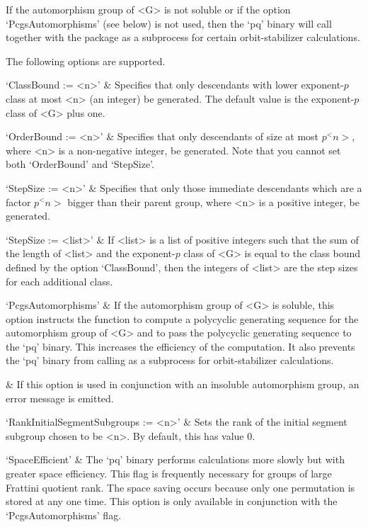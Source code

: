 If the automorphism group  of  <G>  is  not  soluble  or  if  the  option
`PcgsAutomorphisms' (see below) is not used, then the  `pq'  binary  will
call {\GAP} together with the {\AutPGrp}  package  as  a  subprocess  for
certain orbit-stabilizer calculations.

The following options are supported.

\beginitems

`ClassBound := <n>' &
Specifies that only descendants with lower exponent-$p$ class at most <n>
(an integer) be generated. The default value is the exponent-$p$ class of
<G> plus one.

`OrderBound := <n>' &
Specifies that only descendants of size at most $p^<n>$, where <n>  is  a
non-negative integer,  be  generated.  Note  that  you  cannot  set  both
`OrderBound' and `StepSize'.

`StepSize := <n>' &
Specifies that only  those  immediate  descendants  which  are  a  factor
$p^<n>$ bigger than their parent group, where <n> is a positive  integer,
be generated.

`StepSize := <list>' &
If <list> is a list of positive integers such that the sum of the  length
of <list> and the exponent-$p$ class of <G> is equal to the  class  bound
defined by the option `ClassBound', then the integers of <list>  are  the
step sizes for each additional class.

`PcgsAutomorphisms' &
If the automorphism group of <G> is soluble, this  option  instructs  the
function to compute a polycyclic generating sequence for the automorphism
group of <G> and to pass the polycyclic generating sequence to  the  `pq'
binary. This  increases  the  efficiency  of  the  computation.  It  also
prevents the  `pq'  binary  from  calling  {\GAP}  as  a  subprocess  for
orbit-stabilizer calculations.

&
If this option is used in  conjunction  with  an  insoluble  automorphism
group, an error message is emitted.

`RankInitialSegmentSubgroups := <n>' &
Sets the rank of the initial  segment  subgroup  chosen  to  be  <n>.  By
default, this has value 0.

`SpaceEfficient' &
The `pq' binary performs calculations more slowly but with greater  space
efficiency. This  flag  is  frequently  necessary  for  groups  of  large
Frattini  quotient  rank.  The  space  saving  occurs  because  only  one
permutation is stored at any one time. This option is only  available  in
conjunction with the `PcgsAutomorphisms' flag.

